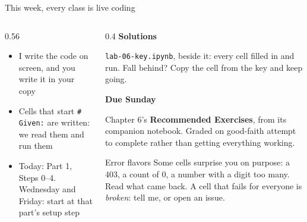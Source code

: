 \documentclass[9pt,aspectratio=169]{beamer}
\begin{document}
\begin{frame}{This week, every class is live coding}
\begin{columns}[T]
\begin{column}{0.56\textwidth}
            \medskip
            \begin{itemize}\small
                \item I write the code on screen, and you write it in your copy
                \item Cells that start \texttt{\# Given:} are written: we read them and run them
                \item Today: Part 1, Steps 0--4. Wednesday and Friday: start at that part's setup step
            \end{itemize}
        \end{column}
        \begin{column}{0.4\textwidth}
            \textbf{Solutions}\\[2pt]
            {\footnotesize \texttt{lab-06-key.ipynb}, beside it: every cell filled in and run. Fall behind? Copy the cell from the key and keep going.\par}
            \medskip
            \textbf{Due Sunday}\\[2pt]
            {\footnotesize Chapter 6's \textbf{Recommended Exercises}, from its companion notebook. Graded on good-faith attempt to complete rather than getting everything working.\par}
            \medskip
            \begin{alertblock}{Error flavors}
                \footnotesize Some cells surprise you on purpose: a 403, a count of 0, a number with a digit too many. Read what came back. A cell that fails for everyone is \textit{broken}: tell me, or open an issue.
            \end{alertblock}
        \end{column}
    \end{columns}
\end{frame}
\end{document}
